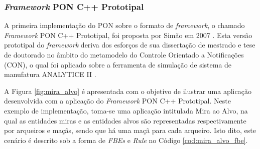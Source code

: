 
\subsubsection{\textit{Framework} PON C++ Prototipal}\label{sec:fw_prot}

A primeira implementação do PON sobre o formato de \textit{framework}, o chamado
\textit{Framework} PON C++ Prototipal, foi proposta por Simão em 2007
\cite{pat_simao_2008,simao_2012a}. Esta versão prototipal do \textit{framework}
deriva dos esforços de sua dissertação de mestrado e tese de doutorado no âmbito
do metamodelo do Controle Orientado a Notificações (CON), o qual foi aplicado
sobre a ferramenta de simulação de sistema de manufatura ANALYTICE II
\cite{doc_simao_2005,simao_2009}.

A Figura \ref{fig:mira_alvo} é apresentada com o objetivo de ilustrar uma
aplicação desenvolvida com a aplicação do \textit{Framework} PON C++ Prototipal.
Neste exemplo de implementação, toma-se uma aplicação intitulada Mira ao Alvo,
na qual as entidades miras e as entidades alvos são representadas
respectivamente por arqueiros e maçãs, sendo que há uma maçã para cada arqueiro.
Isto dito, este cenário é descrito sob a forma de \textit{FBEs} e \textit{Rule}
no Código \ref{cod:mira_alvo_fbe}.

